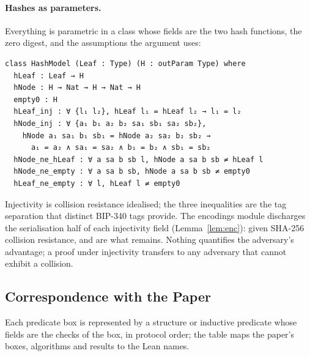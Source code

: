 \paragraph{Hashes as parameters.} Everything is parametric in a class
 whose fields are the two hash functions, the zero digest,
and the assumptions the argument uses:

\begin{lstlisting}
class HashModel (Leaf : Type) (H : outParam Type) where
  hLeaf : Leaf → H
  hNode : H → Nat → H → Nat → H
  empty0 : H
  hLeaf_inj : ∀ {l₁ l₂}, hLeaf l₁ = hLeaf l₂ → l₁ = l₂
  hNode_inj : ∀ {a₁ b₁ a₂ b₂ sa₁ sb₁ sa₂ sb₂},
    hNode a₁ sa₁ b₁ sb₁ = hNode a₂ sa₂ b₂ sb₂ →
      a₁ = a₂ ∧ sa₁ = sa₂ ∧ b₁ = b₂ ∧ sb₁ = sb₂
  hNode_ne_hLeaf : ∀ a sa b sb l, hNode a sa b sb ≠ hLeaf l
  hNode_ne_empty : ∀ a sa b sb, hNode a sa b sb ≠ empty0
  hLeaf_ne_empty : ∀ l, hLeaf l ≠ empty0
\end{lstlisting}

Injectivity is collision resistance idealised; the three inequalities are
the tag separation that distinct BIP-340 tags provide. The encodings
module discharges the serialisation half of each injectivity field
(Lemma~\ref{lem:enc}): given SHA-256 collision resistance,
 and  are what remains.
Nothing quantifies the adversary's advantage; a proof under injectivity
transfers to any adversary that cannot exhibit a collision.


\subsection{Correspondence with the Paper}\label{app:lean-corr}

Each predicate box is represented by a structure or inductive predicate
whose fields are the checks of the box, in protocol order; the table maps
the paper's boxes, algorithms and results to the Lean names.

